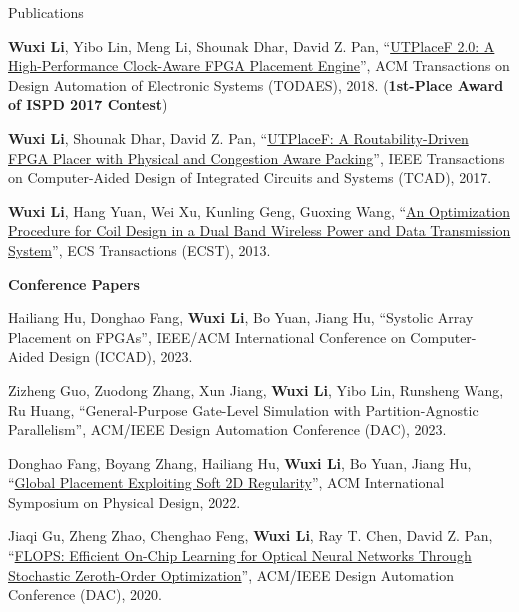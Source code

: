 \begin{rSection}{Publications}
\begin{description}[font=\normalfont]
\item[{[J3]}]{
    \textbf{Wuxi Li}, Yibo Lin, Meng Li, Shounak Dhar, David Z. Pan,
    ``\href{https://dl.acm.org/citation.cfm?id=3174849}{UTPlaceF 2.0: A High-Performance Clock-Aware FPGA Placement Engine}'',
    ACM Transactions on Design Automation of Electronic Systems (TODAES), 2018.
    (\textbf{1st-Place Award of ISPD 2017 Contest})
}

\item[{[J2]}]{
    \textbf{Wuxi Li}, Shounak Dhar, David Z. Pan,
    ``\href{http://ieeexplore.ieee.org/document/7984833/}{UTPlaceF: A Routability-Driven FPGA Placer with Physical and Congestion Aware Packing}'',
    IEEE Transactions on Computer-Aided Design of Integrated Circuits and Systems (TCAD), 2017.
}

\item[{[J1]}]{
    \textbf{Wuxi Li}, Hang Yuan, Wei Xu, Kunling Geng, Guoxing Wang,
    ``\href{http://ecst.ecsdl.org/content/52/1/1091.short}{An Optimization Procedure for Coil Design in a Dual Band Wireless Power and Data Transmission System}'',
    ECS Transactions (ECST), 2013.
}

\end{description}

\textbf{Conference Papers}
\begin{description}[font=\normalfont]
\item[{[C14]}]{
    Hailiang Hu, Donghao Fang, \textbf{Wuxi Li}, Bo Yuan, Jiang Hu,
    ``Systolic Array Placement on FPGAs'',
    IEEE/ACM International Conference on Computer-Aided Design (ICCAD), 2023.
}

\item[{[C13]}]{
    Zizheng Guo, Zuodong Zhang, Xun Jiang, \textbf{Wuxi Li}, Yibo Lin, Runsheng Wang, Ru Huang,
    ``General-Purpose Gate-Level Simulation with Partition-Agnostic Parallelism'',
    ACM/IEEE Design Automation Conference (DAC), 2023.
}

\item[{[C12]}]{
    Donghao Fang, Boyang Zhang, Hailiang Hu, \textbf{Wuxi Li}, Bo Yuan, Jiang Hu,
    ``\href{https://dl.acm.org/doi/10.1145/3505170.3506723}{Global Placement Exploiting Soft 2D Regularity}'',
    ACM International Symposium on Physical Design, 2022.
}

\item[{[C11]}]{
    Jiaqi Gu, Zheng Zhao, Chenghao Feng, \textbf{Wuxi Li}, Ray T. Chen, David Z. Pan,
    ``\href{https://ieeexplore.ieee.org/document/9218593}{FLOPS: Efficient On-Chip Learning for Optical Neural Networks Through Stochastic Zeroth-Order Optimization}'',
    ACM/IEEE Design Automation Conference (DAC), 2020.
}


\end{description}
\end{rSection}
